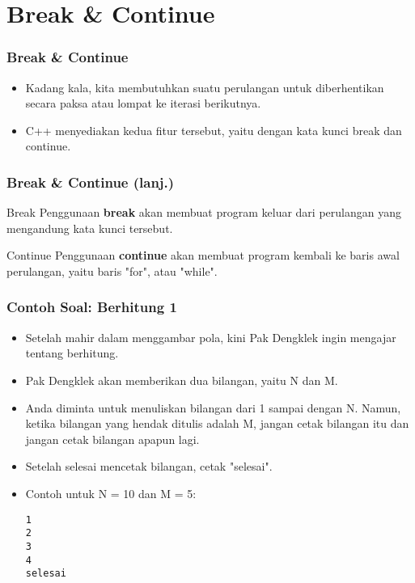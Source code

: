 \section{Break \& Continue}
\frame{\sectionpage}

\begin{frame}
\frametitle{Break \& Continue}
\begin{itemize}
  \item Kadang kala, kita membutuhkan suatu perulangan untuk diberhentikan secara paksa atau lompat ke iterasi berikutnya.
  \item C++ menyediakan kedua fitur tersebut, yaitu dengan kata kunci \alert{break} dan \alert{continue}.
\end{itemize}
\end{frame}

\begin{frame}
\frametitle{Break \& Continue (lanj.)}
\begin{block}{Break}
Penggunaan \textbf{break} akan membuat program keluar dari perulangan yang mengandung kata kunci tersebut.
\end{block}
\begin{block}{Continue}
Penggunaan \textbf{continue} akan membuat program kembali ke baris awal perulangan, yaitu baris "for", atau "while".
\end{block}
\end{frame}

\begin{frame}[fragile]
\frametitle{Contoh Soal: Berhitung 1}
\begin{itemize}
  \item Setelah mahir dalam menggambar pola, kini Pak Dengklek ingin mengajar tentang berhitung.
  \item Pak Dengklek akan memberikan dua bilangan, yaitu N dan M.
  \item Anda diminta untuk menuliskan bilangan dari 1 sampai dengan N. Namun, ketika bilangan yang hendak ditulis adalah M, jangan cetak bilangan itu dan jangan cetak bilangan apapun lagi.
  \item Setelah selesai mencetak bilangan, cetak "selesai".
  \item Contoh untuk N = 10 dan M = 5:
\begin{lstlisting}
1
2
3
4
selesai
\end{lstlisting}
\end{itemize}
\end{frame}

